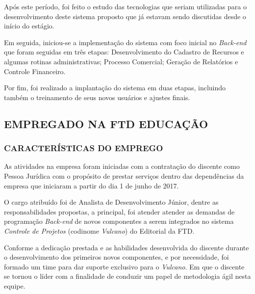 \documentclass[
  12pt,				%
  openany,
  oneside,
  a4paper,			%
  english,			%
  brazil
]{article}
\numberwithin{figure}{section}
\numberwithin{table}{section}
\begin{document}
Após este período, foi feito o estudo das tecnologias que seriam utilizadas para o desenvolvimento deste sistema proposto que já estavam sendo discutidas desde o início do estágio.

Em seguida, iniciou-se a implementação do sistema com foco inicial no \textit{Back-end} que foram seguidas em três etapas: Desenvolvimento do Cadastro de Recursos e algumas rotinas administrativas; Processo Comercial; Geração de Relatórios e Controle Financeiro.

Por fim, foi realizado a implantação do sistema em duas etapas, incluindo também o  treinamento de seus novos usuários e ajustes finais.



\subsection{EMPREGADO NA FTD EDUCAÇÃO}

\subsubsection{CARACTERÍSTICAS DO EMPREGO}

As atividades na empresa foram iniciadas com a contratação do discente como Pessoa Jurídica com o propósito de prestar serviços dentro das dependências da empresa que iniciaram a partir do dia 1 de junho de 2017. 

O cargo atribuído foi de Analista de Desenvolvimento Júnior, dentre as responsabilidades propostas, a principal, foi atender atender as demandas de programação \textit{Back-end} de novos componentes a serem integrados no sistema \textit{Controle de Projetos} (codinome \textit{Vulcano}) do Editorial da FTD.



Conforme a dedicação prestada e as habilidades desenvolvida do discente durante o desenvolvimento dos primeiros novos componentes, e por necessidade, foi formado um time para dar suporte exclusivo para o \textit{Vulcano}. Em que o discente se tornou o líder com a finalidade de conduzir um papel de metodologia ágil nesta equipe.
\end{document}
